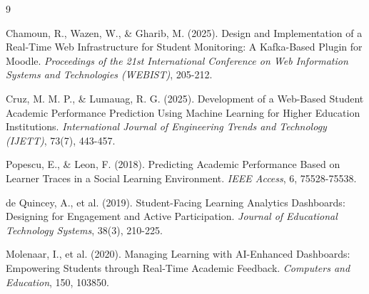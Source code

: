 \documentclass[11pt, a4paper]{article}
\begin{document}
\begin{thebibliography}{9}

Chamoun, R., Wazen, W., \& Gharib, M. (2025). Design and Implementation of a Real-Time Web Infrastructure for Student Monitoring: A Kafka-Based Plugin for Moodle. \emph{Proceedings of the 21st International Conference on Web Information Systems and Technologies (WEBIST)}, 205-212.

Cruz, M. M. P., \& Lumauag, R. G. (2025). Development of a Web-Based Student Academic Performance Prediction Using Machine Learning for Higher Education Institutions. \emph{International Journal of Engineering Trends and Technology (IJETT)}, 73(7), 443-457.

Popescu, E., \& Leon, F. (2018). Predicting Academic Performance Based on Learner Traces in a Social Learning Environment. \emph{IEEE Access}, 6, 75528-75538.

de Quincey, A., et al. (2019). Student-Facing Learning Analytics Dashboards: Designing for Engagement and Active Participation. \emph{Journal of Educational Technology Systems}, 38(3), 210-225.

Molenaar, I., et al. (2020). Managing Learning with AI-Enhanced Dashboards: Empowering Students through Real-Time Academic Feedback. \emph{Computers and Education}, 150, 103850.

\end{thebibliography}
\end{document}

